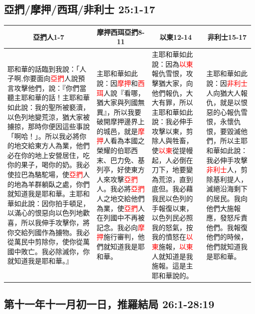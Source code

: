 \subsection{亞捫/摩押/西珥/非利士 25:1-17}
\begin{table}[H]
\centering
\begin{tabular}{p{6.25cm}|p{3.50cm}|p{3.75cm}|p{3.0cm}}\hline\hline
\multicolumn{1}{c|}{亞捫人1-7}&\multicolumn{1}{c|}{摩押西珥亞捫8-11}&\multicolumn{1}{c|}{以東12-14}&\multicolumn{1}{c}{非利士15-17}\\\hline
耶和華的話臨到我說：「人子啊,你要面向\textcolor{red}{亞捫}人說預言攻擊他們，說：『你們當聽主耶和華的話！主耶和華如此說：我的聖所被褻瀆，以色列地變荒涼，猶大家被擄掠，那時你便因這些事說「啊哈！」。所以我必將你的地交給東方人為業，他們必在你的地上安營居住，吃你的果子，喝你的奶。我必使拉巴為駱駝場，使\textcolor{red}{亞捫}人的地為羊群躺臥之處，你們就知道我是耶和華。主耶和華如此說：因你拍手頓足，以滿心的恨惡向以色列地歡喜，所以我伸手攻擊你，將你交給列國作為擄物。我必從萬民中剪除你，使你從萬國中敗亡。我必除滅你，你就知道我是耶和華。』
&主耶和華如此說：因\textcolor{red}{摩押}和\textcolor{red}{西珥}人說『看哪，猶大家與列國無異』，所以我要破開摩押邊界上的城邑，就是\textcolor{red}{摩押}人看為本國之榮耀的伯耶西末、巴力免、基列亭，好使東方人來攻擊\textcolor{red}{亞捫}人。我必將\textcolor{red}{亞捫}人之地交給他們為業，使\textcolor{red}{亞捫}人在列國中不再被記念。我必向\textcolor{red}{摩押}施行審判，他們就知道我是耶和華。
&主耶和華如此說：因為\textcolor{red}{以東}報仇雪恨，攻擊猶大家，向他們報仇，大大有罪，所以主耶和華如此說：我必伸手攻擊以東，剪除人與牲畜，使\textcolor{red}{以東}從提幔起，人必倒在刀下，地要變為荒涼，直到底但。我必藉我民以色列的手報復以東，以色列民必照我的怒氣，按我的憤怒在\textcolor{red}{以東}施報，\textcolor{red}{以東}人就知道是我施報。這是主耶和華說的。
&主耶和華如此說：因\textcolor{red}{非利士}人向猶大人報仇，就是以恨惡的心報仇雪恨，永懷仇恨，要毀滅他們，所以主耶和華如此說：我必伸手攻擊\textcolor{red}{非利士}人，剪除基利提人，滅絕沿海剩下的居民。我向他們大施報應，發怒斥責他們。我報復他們的時候，他們就知道我是耶和華。\\\hline
\end{tabular}
\end{table}


\subsection{第十一年十一月初一日，推羅結局 26:1-28:19}
